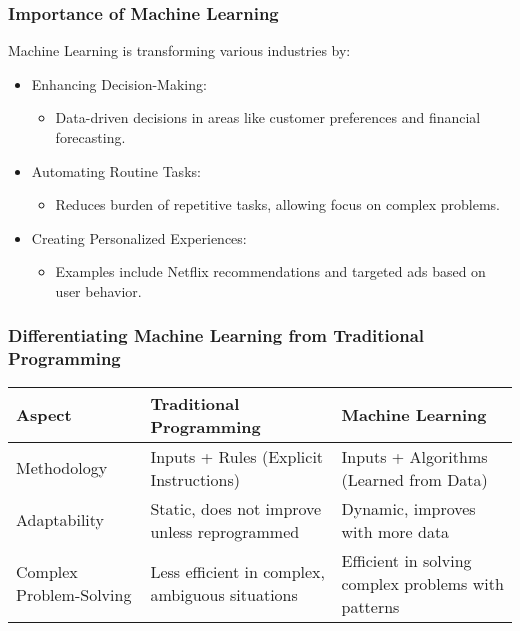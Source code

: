 \documentclass[aspectratio=169]{beamer}
\begin{document}
\begin{frame}[fragile]
    \frametitle{Importance of Machine Learning}
    Machine Learning is transforming various industries by:
    \begin{itemize}
        \item Enhancing Decision-Making: 
        \begin{itemize}
            \item Data-driven decisions in areas like customer preferences and financial forecasting.
        \end{itemize}
        \item Automating Routine Tasks: 
        \begin{itemize}
            \item Reduces burden of repetitive tasks, allowing focus on complex problems.
        \end{itemize}
        \item Creating Personalized Experiences: 
        \begin{itemize}
            \item Examples include Netflix recommendations and targeted ads based on user behavior.
        \end{itemize}
    \end{itemize}
\end{frame}

\begin{frame}[fragile]
    \frametitle{Differentiating Machine Learning from Traditional Programming}
    \begin{table}[ht]
        \centering
        \begin{tabular}{|l|l|l|}
            \hline
            \textbf{Aspect} & \textbf{Traditional Programming} & \textbf{Machine Learning} \\ \hline
            Methodology & Inputs + Rules (Explicit Instructions)  & Inputs + Algorithms (Learned from Data) \\ \hline
            Adaptability & Static, does not improve unless reprogrammed & Dynamic, improves with more data \\ \hline
            Complex Problem-Solving & Less efficient in complex, ambiguous situations & Efficient in solving complex problems with patterns \\ \hline
        \end{tabular}
    \end{table}
\end{frame}
\end{document}
